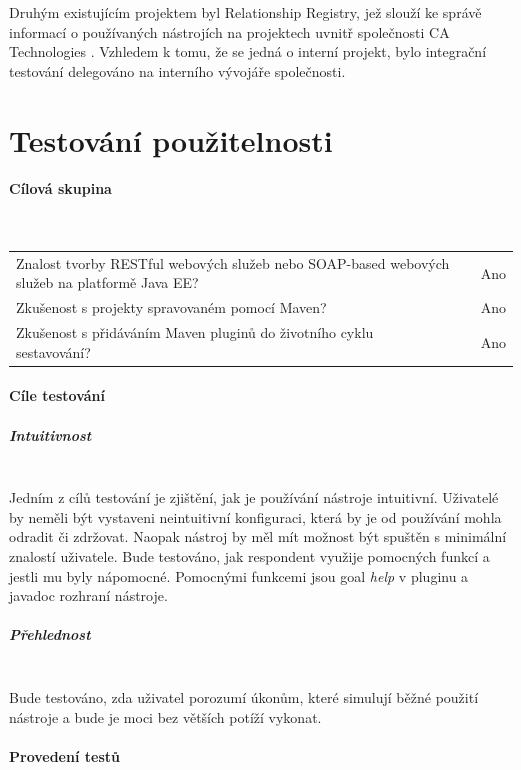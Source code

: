 \documentclass[11pt,twoside,a4paper]{book}
\begin{document}
Druhým existujícím projektem byl Relationship Registry, jež slouží ke správě
informací o používaných nástrojích na projektech uvnitř společnosti CA
Technologies \cite{CAHome}. Vzhledem k tomu, že se jedná o interní projekt, bylo
integrační testování delegováno na interního vývojáře společnosti.

\section{Testování použitelnosti}

\paragraph{Cílová skupina}
\mbox{}\\

\begin{tabular}{m{10cm} m{1cm} m{3cm}}
Znalost tvorby RESTful webových služeb nebo SOAP-based webových služeb na
platformě Java EE? & & Ano \\
Zkušenost s projekty spravovaném pomocí Maven? & & Ano \\
Zkušenost s přidáváním Maven pluginů do životního cyklu sestavování? & & Ano \\
\end{tabular}

\paragraph{Cíle testování}

\subparagraph{Intuitivnost}
\mbox{}\\

Jedním z cílů testování je zjištění, jak je používání nástroje intuitivní.
Uživatelé by neměli být vystaveni neintuitivní konfiguraci, která by je od
používání mohla odradit či zdržovat. Naopak nástroj by měl mít možnost být
spuštěn s minimální znalostí uživatele. Bude testováno, jak respondent
využije pomocných funkcí a jestli mu byly nápomocné.
Pomocnými funkcemi jsou goal {\em help} v pluginu a javadoc rozhraní nástroje.

\subparagraph{Přehlednost}
\mbox{}\\

Bude testováno, zda uživatel porozumí úkonům, které simulují běžné použití
nástroje a bude je moci bez větších potíží vykonat.

\paragraph{Provedení testů}
\mbox{}\\
\end{document}
